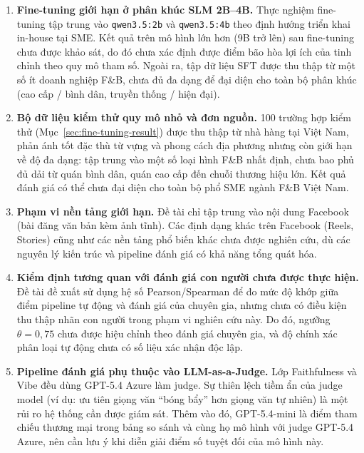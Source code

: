 \begin{enumerate}
  \item \textbf{Fine-tuning giới hạn ở phân khúc SLM 2B--4B.} Thực
    nghiệm fine-tuning tập trung vào \texttt{qwen3.5:2b} và
    \texttt{qwen3.5:4b} theo định hướng triển khai in-house tại SME.
    Kết quả trên mô hình lớn hơn (9B trở lên) sau fine-tuning chưa
    được khảo sát, do đó chưa xác định được điểm bão hòa lợi ích của
    tinh chỉnh theo quy mô tham số. Ngoài ra, tập dữ liệu SFT được
    thu thập từ một số ít doanh nghiệp F\&B, chưa đủ đa dạng để đại
    diện cho toàn bộ phân khúc (cao cấp / bình dân, truyền thống /
    hiện đại).
  \item \textbf{Bộ dữ liệu kiểm thử quy mô nhỏ và đơn nguồn.} 100
    trường hợp kiểm thử (Mục~\ref{sec:fine-tuning-result}) được thu thập
    từ nhà hàng tại Việt Nam, phản ánh tốt đặc thù từ vựng và phong
    cách địa phương nhưng còn giới hạn về độ đa dạng: tập trung vào
    một số loại hình F\&B nhất định, chưa bao phủ đủ dải từ quán bình
    dân, quán cao cấp đến chuỗi thương hiệu lớn. Kết quả đánh giá có
    thể chưa đại diện cho toàn bộ phổ SME ngành F\&B Việt Nam.
  \item \textbf{Phạm vi nền tảng giới hạn.} Đề tài chỉ tập trung vào
    nội dung Facebook (bài đăng văn bản kèm ảnh tĩnh). Các định dạng
    khác trên Facebook (Reels, Stories) cũng như các nền tảng phổ
    biến khác chưa được nghiên cứu, dù các nguyên lý kiến trúc và
    pipeline đánh giá có khả năng tổng quát hóa.
  \item \textbf{Kiểm định tương quan với đánh giá con người chưa được
    thực hiện.} Đề tài đề xuất sử dụng hệ số Pearson/Spearman để đo
    mức độ khớp giữa điểm pipeline tự động và đánh giá của chuyên gia,
    nhưng chưa có điều kiện thu thập nhãn con người trong phạm vi
    nghiên cứu này. Do đó, ngưỡng $\theta = 0{,}75$ chưa được hiệu
    chỉnh theo đánh giá chuyên gia, và độ chính xác phân loại tự động
    chưa có số liệu xác nhận độc lập.
  \item \textbf{Pipeline đánh giá phụ thuộc vào LLM-as-a-Judge.}
    Lớp Faithfulness và Vibe đều dùng GPT-5.4 Azure làm judge. Sự thiên
    lệch tiềm ẩn của judge model (ví dụ: ưu tiên giọng văn ``bóng bẩy''
    hơn giọng văn tự nhiên) là một rủi ro hệ thống cần được giám sát.
    Thêm vào đó, GPT-5.4-mini là điểm tham chiếu thương mại trong bảng
    so sánh và cùng họ mô hình với judge GPT-5.4 Azure, nên cần lưu ý
    khi diễn giải điểm số tuyệt đối của mô hình này.
\end{enumerate}

